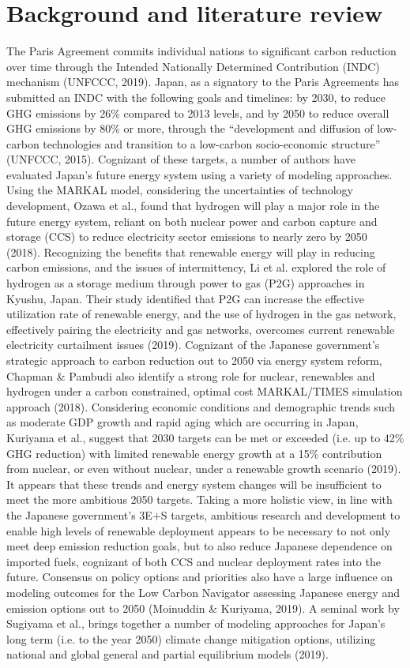 \section{Background and literature review} \label{litreview}
The Paris Agreement commits individual nations to significant carbon reduction over time through the Intended Nationally Determined Contribution (INDC) mechanism (UNFCCC, 2019). Japan, as a signatory to the Paris Agreements has submitted an INDC with the following goals and timelines: by 2030, to reduce GHG emissions by 26\% compared to 2013 levels, and by 2050 to reduce overall GHG emissions by 80\% or more, through the “development and diffusion of low-carbon technologies and transition to a low-carbon socio-economic structure” (UNFCCC, 2015). Cognizant of these targets, a number of authors have evaluated Japan’s future energy system using a variety of modeling approaches. Using the MARKAL model, considering the uncertainties of technology development, Ozawa et al., found that hydrogen will play a major role in the future energy system, reliant on both nuclear power and carbon capture and storage (CCS) to reduce electricity sector emissions to nearly zero by 2050 (2018). Recognizing the benefits that renewable energy will play in reducing carbon emissions, and the issues of intermittency, Li et al. explored the role of hydrogen as a storage medium through power to gas (P2G) approaches in Kyushu, Japan. Their study identified that P2G can increase the effective utilization rate of renewable energy, and the use of hydrogen in the gas network, effectively pairing the electricity and gas networks, overcomes current renewable electricity curtailment issues (2019). Cognizant of the Japanese government’s strategic approach to carbon reduction out to 2050 via energy system reform, Chapman & Pambudi also identify a strong role for nuclear, renewables and hydrogen under a carbon constrained, optimal cost MARKAL/TIMES simulation approach (2018). Considering economic conditions and demographic trends such as moderate GDP growth and rapid aging which are occurring in Japan, Kuriyama et al., suggest that 2030 targets can be met or exceeded (i.e. up to 42\% GHG reduction) with limited renewable energy growth at a 15\% contribution from nuclear, or even without nuclear, under a renewable growth scenario (2019). It appears that these trends and energy system changes will be insufficient to meet the more ambitious 2050 targets. Taking a more holistic view, in line with the Japanese government’s 3E+S targets, ambitious research and development to enable high levels of renewable deployment appears to be necessary to not only meet deep emission reduction goals, but to also reduce Japanese dependence on imported fuels, cognizant of both CCS and nuclear deployment rates into the future. Consensus on policy options and priorities also have a large influence on modeling outcomes for the  Low Carbon Navigator assessing Japanese energy and emission options out to 2050 (Moinuddin & Kuriyama, 2019). A seminal work by Sugiyama et al., brings together a number of modeling approaches for Japan’s long term (i.e. to the year 2050) climate change mitigation options, utilizing national and global general and partial equilibrium models (2019). 